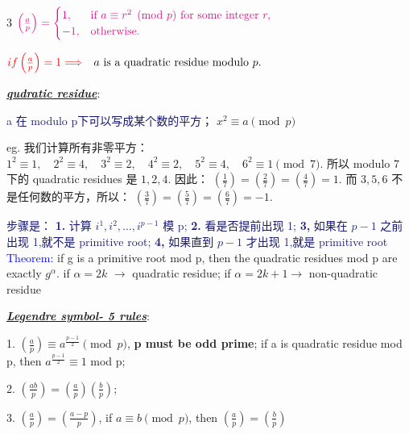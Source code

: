 \documentclass[12pt]{article}
\newcommand{\bulletPoint}[1]{\underline{\textit{\textbf{#1}}}}
\begin{document}
\begin{multicols*}{3}
$
{\color{magenta!90!black}
\left(\frac{a}{p}\right)
=
\begin{cases}
1, & \text{if } a \equiv r^2 \pmod{p} \text{ for some integer } r,\\
-1, & \text{otherwise.}
\end{cases}
}
$

$
\textcolor{red}{ if \left(\frac{a}{p}\right)=1\Longrightarrow}
\quad
a \text{ is a quadratic residue modulo } p.
$



\bulletPoint{qudratic residue}:

{\fontsize{5.5pt}{5pt}\selectfont \textcolor{MidnightBlue}{a 在 modulo p下可以写成某个数的平方}； 
\textcolor{magenta!90!black}{$x^2 \equiv a \pmod{p}$}}

eg. 我们计算所有非零平方：
$
1^2\equiv 1,\quad
2^2\equiv 4,\quad
3^2\equiv 2,\quad
4^2\equiv 2,\quad
5^2\equiv 4,\quad
6^2\equiv 1
\pmod 7.
$
所以 modulo \(7\) 下的 quadratic residues 是
$
1,2,4.
$
因此：
$
\left(\frac{1}{7}\right)
=
\left(\frac{2}{7}\right)
=
\left(\frac{4}{7}\right)
=1.
$
而 \(3,5,6\) 不是任何数的平方，所以：
$
\left(\frac{3}{7}\right)
=
\left(\frac{5}{7}\right)
=
\left(\frac{6}{7}\right)
=-1.
$ 


{\fontsize{5.5pt}{5pt}\selectfont \textcolor{MidnightBlue}
{步骤是：
\textbf{1.} 计算 $i^1, i^2, \ldots, i^{p-1}$ 模 p;
\textbf{2.} 看是否提前出现 1;
\textbf{3,} 如果在 $p-1$ 之前出现 1,就不是 primitive root;
\textbf{4,} 如果直到 $p-1$ 才出现 1,就是 primitive root } }\\[2pt]

\textcolor{blue}{Theorem:} if g is a primitive root mod p, then the quadratic residues mod p are exactly $g^\alpha$. if $\alpha= 2k$ 
$\rightarrow $ quadratic residue; if $\alpha= 2k+1 \rightarrow $ non-quadratic residue




\bulletPoint{Legendre symbol- 5 rules}:

\textcolor{magenta!90!black}
{1. $(\frac{a}{p})\equiv a^{\frac{p-1}{2}} \pmod{p}$, \textbf{p must be odd prime}; } 
if a is quadratic residue mod p, then \textcolor{magenta!90!black}{$a^{\frac{p-1}{2}}\equiv 1$ mod p}; {\fontsize{5.5pt}{5pt}}

\textcolor{magenta!90!black}{2. $\left(\frac{ab}{p}\right)=\left(\frac{a}{p}\right)\left(\frac{b}{p}\right)$; }

\textcolor{magenta!90!black}
{3. $ (\frac{a}{p}) = (\frac{a-p}{p})$, if $a\equiv b \pmod{p}$, then $\left(\frac{a}{p}\right)=\left(\frac{b}{p}\right)$}


\end{multicols*}
\end{document}
